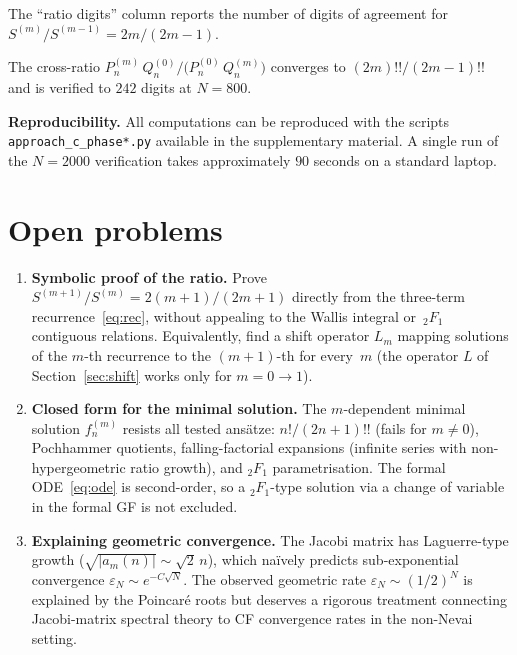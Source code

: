 \documentclass[11pt]{article}
\theoremstyle{definition}
\theoremstyle{remark}
\begin{document}
The ``ratio digits'' column reports the number of digits of agreement for
$S^{(m)}/S^{(m-1)} = 2m/(2m{-}1)$.

The cross-ratio $P_n^{(m)}\,Q_n^{(0)}\big/\bigl(P_n^{(0)}\,Q_n^{(m)}\bigr)$
converges to $(2m)!!/(2m{-}1)!!$ and is verified to $242$ digits
at $N = 800$.

\medskip\noindent\textbf{Reproducibility.}
All computations can be reproduced with the scripts
\texttt{approach\_c\_phase*.py} available in the supplementary material.
A single run of the $N=2000$ verification takes approximately
$90$ seconds on a standard laptop.


\section{Open problems}\label{sec:open}

\begin{enumerate}[label=(\arabic*)]
\item \textbf{Symbolic proof of the ratio.}
  Prove $S^{(m+1)}/S^{(m)} = 2(m{+}1)/(2m{+}1)$ directly from
  the three-term recurrence~\eqref{eq:rec}, without appealing
  to the Wallis integral or~${}_2F_1$ contiguous relations.
  Equivalently, find a shift operator $L_m$ mapping
  solutions of the $m$-th recurrence to the $(m{+}1)$-th
  for every~$m$ (the operator $L$ of Section~\ref{sec:shift}
  works only for $m{=}0 \to 1$).

\item \textbf{Closed form for the minimal solution.}
  The $m$-dependent minimal solution $f_n^{(m)}$ resists all
  tested ans\"atze: $n!/(2n{+}1)!!$ (fails for $m \neq 0$),
  Pochhammer quotients, falling-factorial expansions
  (infinite series with non-hypergeometric ratio growth),
  and ${}_2F_1$ parametrisation.
  The formal ODE~\eqref{eq:ode} is second-order, so a
  ${}_2F_1$-type solution via a change of variable in the
  formal GF is not excluded.

\item \textbf{Explaining geometric convergence.}
  The Jacobi matrix has Laguerre-type growth
  ($\sqrt{|a_m(n)|} \sim \sqrt{2}\,n$), which na\"ively predicts
  sub-exponential convergence $\varepsilon_N \sim e^{-C\sqrt{N}}$.
  The observed geometric rate $\varepsilon_N \sim (1/2)^N$
  is explained by the Poincar\'e roots but deserves a
  rigorous treatment connecting Jacobi-matrix spectral theory
  to CF convergence rates in the non-Nevai setting.
\end{enumerate}
\end{document}
